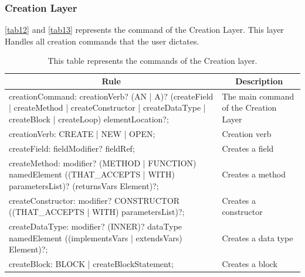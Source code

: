 \subsubsection{Creation Layer}
\autoref{tab12} and \autoref{tab13} represents the command of the Creation Layer. This layer Handles all creation commands that the user dictates.
\begin{table}[H]
\centering
\begin{tabular}{|p{8cm}|p{7cm}|}
\hline
\multicolumn{1}{|c|}{{\bf Rule}} & \multicolumn{1}{c|}{{\bf Description}} \\ \hline
creationCommand: creationVerb? (AN | A)? (createField | createMethod | createConstructor | createDataType | createBlock | createLoop) elementLocation?; & The main command of the Creation Layer \\ \hline
creationVerb: CREATE | NEW | OPEN; & Creation verb                          \\ \hline
createField: fieldModifier? fieldRef; & Creates a field                        \\ \hline
createMethod: modifier? (METHOD | FUNCTION) namedElement ((THAT\_ACCEPTS | WITH) parametersList)? (returnsVars Element)?;                               & Creates a method                       \\ \hline
createConstructor: modifier? CONSTRUCTOR ((THAT\_ACCEPTS | WITH) parametersList)?;                                                                      & Creates a constructor                  \\ \hline
createDataType: modifier? (INNER)? dataType namedElement ((implementsVars | extendsVars) Element)?;                                                     & Creates a data type                    \\ \hline
createBlock: BLOCK | createBlockStatement;                                                                                                              & Creates a block                        \\ \hline
\end{tabular}
\caption{This table represents the commands of the Creation layer.}
\label{tab12}
\end{table}
